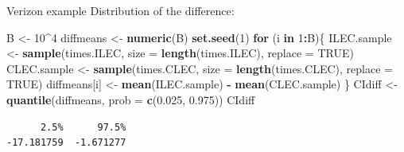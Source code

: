 \documentclass[
  ignorenonframetext,
]{beamer}
\newenvironment{Shaded}{\begin{snugshade}}{\end{snugshade}}
\newcommand{\AttributeTok}[1]{\textcolor[rgb]{0.13,0.29,0.53}{#1}}
\newcommand{\ConstantTok}[1]{\textcolor[rgb]{0.56,0.35,0.01}{#1}}
\newcommand{\ControlFlowTok}[1]{\textcolor[rgb]{0.13,0.29,0.53}{\textbf{#1}}}
\newcommand{\DecValTok}[1]{\textcolor[rgb]{0.00,0.00,0.81}{#1}}
\newcommand{\FloatTok}[1]{\textcolor[rgb]{0.00,0.00,0.81}{#1}}
\newcommand{\FunctionTok}[1]{\textcolor[rgb]{0.13,0.29,0.53}{\textbf{#1}}}
\newcommand{\NormalTok}[1]{#1}
\newcommand{\OtherTok}[1]{\textcolor[rgb]{0.56,0.35,0.01}{#1}}
\newcommand{\SpecialCharTok}[1]{\textcolor[rgb]{0.81,0.36,0.00}{\textbf{#1}}}
\begin{document}
\begin{frame}[fragile]{Verizon example}
\protect\hypertarget{verizon-example-6}{}
Distribution of the difference:

\tiny

\begin{Shaded}
\begin{Highlighting}[]
\NormalTok{B }\OtherTok{\textless{}{-}} \DecValTok{10}\SpecialCharTok{\^{}}\DecValTok{4}
\NormalTok{diffmeans }\OtherTok{\textless{}{-}} \FunctionTok{numeric}\NormalTok{(B)}
\FunctionTok{set.seed}\NormalTok{(}\DecValTok{1}\NormalTok{)}
\ControlFlowTok{for}\NormalTok{ (i }\ControlFlowTok{in} \DecValTok{1}\SpecialCharTok{:}\NormalTok{B)\{}
\NormalTok{  ILEC.sample }\OtherTok{\textless{}{-}} \FunctionTok{sample}\NormalTok{(times.ILEC, }\AttributeTok{size =} \FunctionTok{length}\NormalTok{(times.ILEC), }\AttributeTok{replace =} \ConstantTok{TRUE}\NormalTok{)}
\NormalTok{  CLEC.sample }\OtherTok{\textless{}{-}} \FunctionTok{sample}\NormalTok{(times.CLEC, }\AttributeTok{size =} \FunctionTok{length}\NormalTok{(times.CLEC), }\AttributeTok{replace =} \ConstantTok{TRUE}\NormalTok{)}
\NormalTok{  diffmeans[i] }\OtherTok{\textless{}{-}} \FunctionTok{mean}\NormalTok{(ILEC.sample) }\SpecialCharTok{{-}} \FunctionTok{mean}\NormalTok{(CLEC.sample)}
\NormalTok{\}}
\NormalTok{CIdiff }\OtherTok{\textless{}{-}} \FunctionTok{quantile}\NormalTok{(diffmeans, }\AttributeTok{prob =} \FunctionTok{c}\NormalTok{(}\FloatTok{0.025}\NormalTok{, }\FloatTok{0.975}\NormalTok{))}
\NormalTok{CIdiff}
\end{Highlighting}
\end{Shaded}

\begin{verbatim}
      2.5%      97.5% 
-17.181759  -1.671277 
\end{verbatim}

\normalsize
\end{frame}
\end{document}
